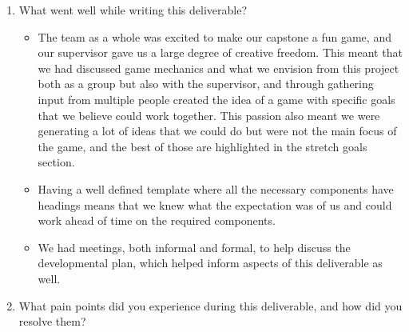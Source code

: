 \documentclass{article}
\begin{document}
\begin{enumerate}
    \item What went well while writing this deliverable?\\
    
	\begin{itemize}
		\item The team as a whole was excited to make our capstone a fun game, and our supervisor gave us a large degree of creative freedom. This meant that we had discussed game mechanics and what we envision from this project both as a group but also with the supervisor, and through gathering input from multiple people created the idea of a game with specific goals that we believe could work together. This passion also meant we were generating a lot of ideas that we could do but were not the main focus of the game, and the best of those are highlighted in the stretch goals section.
		\item Having a well defined template where all the necessary components have headings means that we knew what the expectation was of us and could work ahead of time on the required components.
		\item We had meetings, both informal and formal, to help discuss the developmental plan, which helped inform aspects of this deliverable as well.
	\end{itemize}
    
    \item What pain points did you experience during this deliverable, and how
    did you resolve them?
    

\end{enumerate}
\end{document}
